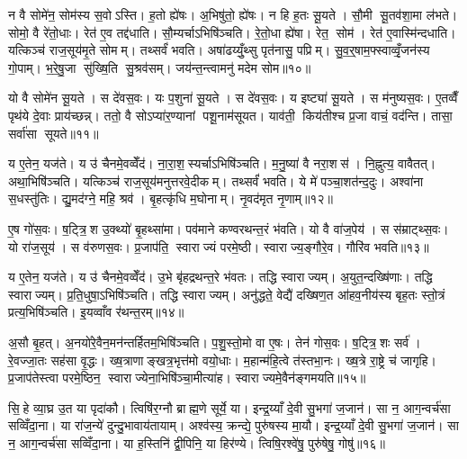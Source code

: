 न वै सोमे॑न॒ सोम॑स्य स॒वोऽस्ति। ह॒तो ह्ये॑षः। अ॒भिषु॑तो॒ ह्ये॑षः। न हि ह॒तः सू॒यते। सौ॒मी सू॒तव॑शा॒मा ल॑भते। सोमो॒ वै रे॑तो॒धाः। रेत॑ ए॒व तद्द॑धाति। सौ॒म्यर्चाऽभिषि॑ञ्चति। रे॒तो॒धा ह्ये॑षा। रेत॒ सोम॑। रेत॑ ए॒वास्मि॑न्दधाति। यत्किञ्च॑ राज॒सूय॑मृ॒ते सोमम्। तथ्सर्वं॑ भवति। अषा॑ढय्युँ॒थ्सु पृत॑नासु॒ पप्रिम्। सु॒व॒र्॒षाम॒फ्स्वाव्वृँ॒जन॑स्य गो॒पाम्। भ॒रे॒षु॒जा सु॑ख्षि॒ति सु॒श्रव॑सम्। जय॑न्त॒न्त्वामनु॑ मदेम सोम॥१०॥\anuvakamend[रेत॒ सोम॑ स॒प्त च॑]

यो वै सोमे॑न सू॒यते। स दे॑वस॒वः। यः प॒शुना॑ सू॒यते। स दे॑वस॒वः। य इष्ट्या॑ सू॒यते। स म॑नुष्यस॒वः। ए॒तव्वैँ पृथ॑ये दे॒वाः प्राय॑च्छन्न्। ततो॒ वै सोऽप्या॑र॒ण्यानां पशू॒नाम॑सूयत। याव॑ती॒ किय॑तीश्च प्र॒जा वाचं॒ वद॑न्ति। तासा॒ सर्वा॑सा सूयते॥११॥

य ए॒तेन॒ यज॑ते। य उ॑ चैनमे॒वव्वेँद॑। ना॒रा॒श॒स्यर्चाऽभिषि॑ञ्चति। म॒नु॒ष्या॑ वै नरा॒शस॑। नि॒ह्नुत्य॒ वावैतत्। अथा॒भिषि॑ञ्चति। यत्किञ्च॑ राज॒सूय॑मनुत्तरवे॒दीकम्। तथ्सर्वं॑ भवति। ये मे॑ पञ्चा॒शत॑न्द॒दुः। अश्वा॑ना स॒धस्तु॑तिः। द्यु॒मद॑ग्ने॒ महि॒ श्रव॑। बृ॒हत्कृ॑धि म॒घोनाम्। नृ॒वद॑मृत नृ॒णाम्॥१२॥\anuvakamend[सू॒य॒ते॒ स॒धस्तु॑ति॒स्त्रीणि॑ च]

ए॒ष गो॑स॒वः। ष॒ट्त्रि॒श उ॒क्थ्यो॑ बृ॒हथ्सा॑मा। पव॑माने कण्वरथन्त॒रं भ॑वति। यो वै वा॑ज॒पेय॑। स स॑म्राट्थ्स॒वः। यो रा॑ज॒सूय॑। स व॑रुणस॒वः। प्र॒जाप॑ति॒ स्वाराज्यं परमे॒ष्ठी। स्वाराज्य॒ङ्गौरे॒व। गौरि॑व भवति॥१३॥

य ए॒तेन॒ यज॑ते। य उ॑ चैनमे॒वव्वेँद॑। उ॒भे बृ॑हद्रथन्त॒रे भ॑वतः। तद्धि स्वाराज्यम्। अ॒युत॒न्दख्षि॑णाः। तद्धि स्वाराज्यम्। प्र॒ति॒धुषा॒ऽभिषि॑ञ्चति। तद्धि स्वाराज्यम्। अनु॑द्धते॒ वेद्यै॑ दख्षिण॒त आ॑हव॒नीय॑स्य बृह॒तः स्तो॒त्रं प्रत्य॒भिषि॑ञ्चति। इ॒यव्वाँव र॑थन्त॒रम्॥१४॥

अ॒सौ बृ॒हत्। अ॒नयो॑रे॒वैन॒मन॑न्तर्\mbox{}हितम॒भिषि॑ञ्चति। प॒शु॒स्तो॒मो वा ए॒षः। तेन॑ गोस॒वः। ष॒ट्त्रि॒शः सर्व॑। रे॒वज्जा॒तः सह॑सा वृ॒द्धः। ख्ष॒त्राणाङ्खत्र॒भृत्त॑मो वयो॒धाः। म॒हान्म॑हि॒त्वे त॑स्तभा॒नः। ख्ष॒त्रे रा॒ष्ट्रे च॑ जागृहि। प्र॒जाप॑तेस्त्वा परमे॒ष्ठिन॒ स्वाराज्येना॒भिषि॑ञ्चा॒मीत्या॑ह। स्वाराज्यमे॒वैन॑ङ्गमयति॥१५॥\anuvakamend[इ॒व॒ भ॒व॒ति॒ र॒थ॒न्त॒रमा॒हैक॑ञ्च]

सि॒हे व्या॒घ्र उ॒त या पृदा॑कौ। त्विषि॑र॒ग्नौ ब्राह्म॒णे सूर्ये॒ या। इन्द्र॒य्याँ दे॒वी सु॒भगा॑ ज॒जान॑। सा न॒ आग॒न्वर्च॑सा सव्विँदा॒ना। या रा॑ज॒न्ये॑ दुन्दु॒भावाय॑तायाम्। अश्व॑स्य॒ क्रन्द्ये॒ पुरु॑षस्य मा॒यौ। इन्द्र॒य्याँ दे॒वी सु॒भगा॑ ज॒जान॑। सा न॒ आग॒न्वर्च॑सा सव्विँदा॒ना। या ह॒स्तिनि॑ द्वी॒पिनि॒ या हिर॑ण्ये। त्विषि॒रश्वे॑षु॒ पुरु॑षेषु॒ गोषु॑॥१६॥

